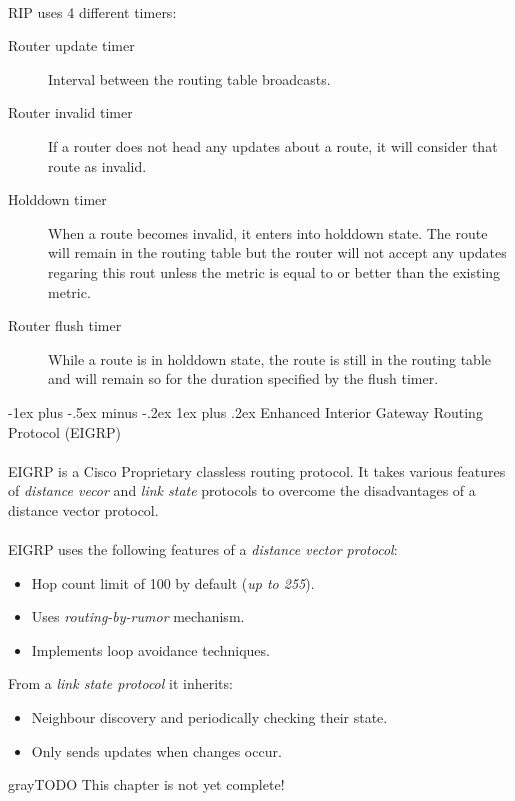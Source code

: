 \documentclass[10pt,landscape]{article}
\makeatletter
\renewcommand{\subsubsection}{\@startsection{subsubsection}{3}{0mm}%
                                {-1ex plus -.5ex minus -.2ex}%
                                {1ex plus .2ex}%
                                {\normalfont\small\bfseries}}
\makeatother
\begin{document}
\begin{multicols}{3}
\paragraph{}
RIP uses 4 different timers:
\begin{description}
	\item[Router update timer] Interval between the routing table broadcasts.
	\item[Router invalid timer] If a router does not head any updates about a route, it will consider that route as invalid.
	\item[Holddown timer] When a route becomes invalid, it enters into holddown state. The route will remain in the routing table but the router will not accept any updates regaring this rout unless the metric is equal to or better than the existing metric.
	\item[Router flush timer] While a route is in holddown state, the route is still in the routing table and will remain so for the duration specified by the flush timer.
\end{description}

\subsubsection{Enhanced Interior Gateway Routing Protocol (EIGRP)}
\paragraph{}
EIGRP is a Cisco Proprietary classless routing protocol. It takes various features of \textit{distance vecor} and \textit{link state} protocols to overcome the disadvantages of a distance vector protocol.
\paragraph{}
EIGRP uses the following features of a \textit{distance vector protocol}:
\begin{itemize}
	\item Hop count limit of 100 by default (\textit{up to 255}).
	\item Uses \textit{routing-by-rumor} mechanism.
	\item Implements loop avoidance techniques.
\end{itemize}
From a \textit{link state protocol} it inherits:
\begin{itemize}
	\item Neighbour discovery and periodically checking their state.
	\item Only sends updates when changes occur.
\end{itemize}
\begin{textbox}{gray}{TODO}
	This chapter is not yet complete!
\end{textbox}


\end{multicols}
\end{document}
